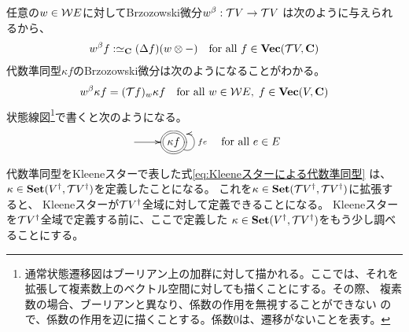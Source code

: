 	任意の$w\in{\ensuremath{{\mathcal{W}}}} E$に対してBrzozowski微分$w^\beta:{{\mathcal{T}}} V\to {\ensuremath{{\mathcal{T}}}} V$
	は次のように与えられるから、
	\begin{equation*}\begin{split}
		w^\beta f :\simeq_{\mathbf{C}} (\Delta f)(w\otimes -)
		\quad\text{for all }f\in{\ensuremath{\mathbf{Vec}}}({{\mathcal{T}}} V,\mathbf{C})
	\end{split}\end{equation*}
	代数準同型$\kappa f$のBrzozowski微分は次のようになることがわかる。
	\begin{equation*}\begin{split}
		w^\beta\kappa f = ({{\mathcal{T}}} f)_w\kappa f
		\quad\text{for all }w\in{\ensuremath{{\mathcal{W}}}} E,\;f\in{\ensuremath{\mathbf{Vec}}}(V,\mathbf{C})
	\end{split}\end{equation*}
	状態線図\footnote{
		通常状態遷移図はブーリアン上の加群に対して描かれる。ここでは、それを
		拡張して複素数上のベクトル空間に対しても描くことにする。その際、
		複素数の場合、ブーリアンと異なり、係数の作用を無視することができない
		ので、係数の作用を辺に描くことする。係数$0$は、遷移がないことを表す。
	}で書くと次のようになる。
	\begin{equation*}\xymatrix{
		\ar[r] &*++[o][F=]{\kappa f} \ar@(rd,ru)_{fe}
	}
		\quad\text{for all }e\in E
	\end{equation*}

	代数準同型をKleeneスターで表した式\eqref{eq:Kleeneスターによる代数準同型}
	は、$\kappa\in{\ensuremath{\mathbf{Set}}}(V^\dag,{{\mathcal{T}}} V^\dag)$を定義したことになる。
	これを$\kappa\in{\ensuremath{\mathbf{Set}}}({{\mathcal{T}}} V^\dag,{{\mathcal{T}}} V^\dag)$に拡張すると、
	Kleeneスターが${{\mathcal{T}}} V^\dag$全域に対して定義できることになる。
	Kleeneスターを${{\mathcal{T}}} V^\dag$全域で定義する前に、ここで定義した
	$\kappa\in{\ensuremath{\mathbf{Set}}}(V^\dag,{{\mathcal{T}}} V^\dag)$をもう少し調べることにする。

